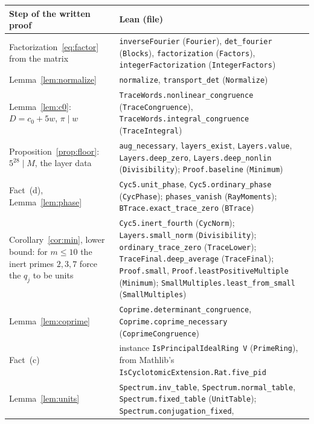 \documentclass[11pt]{article}
\theoremstyle{definition}
\theoremstyle{remark}
\begin{document}
{\begin{table}[!htbp]
\centering\footnotesize
\renewcommand{\arraystretch}{1.05}
\begin{tabular}{@{}>{\raggedright\arraybackslash}p{}>{\raggedright\arraybackslash}p{}@{}}
\hline
Step of the written proof & Lean (file) \\
\hline
Factorization~\eqref{eq:factor} from the matrix &
\texttt{inverseFourier} (\texttt{Fourier}), \texttt{det\_fourier} (\texttt{Blocks}),
\texttt{factorization} (\texttt{Factors}), \texttt{integerFactorization}
(\texttt{IntegerFactors}) \\
Lemma~\ref{lem:normalize} & \texttt{normalize}, \texttt{transport\_det} (\texttt{Normalize}) \\
Lemma~\ref{lem:c0}: $D=c_0+5w$, $\pi\mid w$ &
\texttt{TraceWords.nonlinear\_congruence} (\texttt{TraceCongruence}),
\texttt{TraceWords.integral\_congruence} (\texttt{TraceIntegral}) \\
Proposition~\ref{prop:floor}: $5^{28}\mid M$, the layer data &
\texttt{aug\_necessary}, \texttt{layers\_exist}, \texttt{Layers.value},
\texttt{Layers.deep\_zero}, \texttt{Layers.deep\_nonlin} (\texttt{Divisibility});
\texttt{Proof.baseline} (\texttt{Minimum}) \\
Fact~(d), Lemma~\ref{lem:phase} &
\texttt{Cyc5.unit\_phase}, \texttt{Cyc5.ordinary\_phase} (\texttt{CycPhase});
\texttt{phases\_vanish} (\texttt{RayMoments}); \texttt{BTrace.exact\_trace\_zero} (\texttt{BTrace}) \\
Corollary~\ref{cor:min}, lower bound: for $m\le10$ the inert primes
$2,3,7$ force the $q_j$ to be units &
\texttt{Cyc5.inert\_fourth} (\texttt{CycNorm}); \texttt{Layers.small\_norm} (\texttt{Divisibility});
\texttt{ordinary\_trace\_zero} (\texttt{TraceLower});
\texttt{TraceFinal.deep\_average} (\texttt{TraceFinal}); \texttt{Proof.small},
\texttt{Proof.leastPositiveMultiple} (\texttt{Minimum});
\texttt{SmallMultiples.least\_from\_small} (\texttt{SmallMultiples}) \\
Lemma~\ref{lem:coprime} &
\texttt{Coprime.determinant\_congruence}, \texttt{Coprime.coprime\_necessary}
(\texttt{CoprimeCongruence}) \\
Fact~(c) & instance \texttt{IsPrincipalIdealRing V} (\texttt{PrimeRing}), from
Mathlib's \texttt{IsCyclotomicExtension.Rat.five\_pid} \\
Lemma~\ref{lem:units} &
\texttt{Spectrum.inv\_table}, \texttt{Spectrum.normal\_table}, \texttt{Spectrum.fixed\_table}
(\texttt{UnitTable}); \texttt{Spectrum.conjugation\_fixed},

\end{tabular}
\end{table}}
\end{document}
